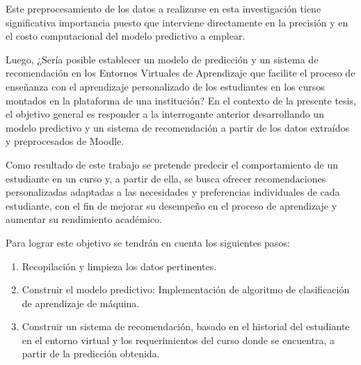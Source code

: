 Este preprocesamiento de los datos a realizarse en esta investigación tiene significativa importancia puesto que 
interviene directamente en la precisión y en el costo computacional del modelo predictivo a emplear.

Luego, ¿Sería posible establecer un modelo de predicción y un sistema de recomendación en los 
Entornos Virtuales de Aprendizaje que facilite el proceso de enseñanza con el aprendizaje personalizado de los 
estudiantes en los cursos montados en la plataforma de una institución? 
En el contexto de la presente tesis, el objetivo general es responder a la interrogante anterior desarrollando 
un modelo predictivo y un sistema de recomendación a partir de los datos extraídos y preprocesados de Moodle. 

Como resultado de este trabajo se pretende predecir el comportamiento de un estudiante en un 
curso y, a partir de ella, se busca ofrecer recomendaciones personalizadas adaptadas a las 
necesidades y preferencias individuales de cada estudiante, con el fin de mejorar su 
desempeño en el proceso de aprendizaje y aumentar su rendimiento académico.

Para lograr este objetivo se tendrán en cuenta los siguientes pasos:
\begin{enumerate}
    \item Recopilación y limpieza los datos pertinentes.
    \item Construir el modelo predictivo: Implementación de algoritmo de clasificación de aprendizaje de máquina.
    \item Construir un sistema de recomendación, basado en el historial del estudiante en el entorno virtual y 
    los requerimientos del curso donde se encuentra, a partir de la predicción obtenida.
\end{enumerate}
